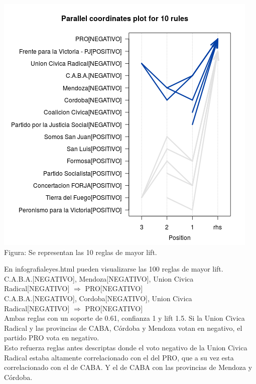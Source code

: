 \documentclass{endm}
\begin{document}
\begin{center}
\includegraphics[scale=0.5]{graficos/paracoordProvinciasPartidos.png} \\
\scriptsize{Figura: Se representan las 10 reglas de mayor lift.}
\end{center} 

En infografialeyes.html pueden visualizarse las 100 reglas de mayor lift. \\

{C.A.B.A.[NEGATIVO],        
Mendoza[NEGATIVO], 
Union Civica Radical[NEGATIVO]} $\Longrightarrow$ {PRO[NEGATIVO]} \\

{C.A.B.A.[NEGATIVO],                  Cordoba[NEGATIVO],  Union Civica Radical[NEGATIVO]}  $\Longrightarrow$ {PRO[NEGATIVO]}\\

Ambas reglas con un soporte de 0.61, confianza 1 y lift 1.5. Si la Union Civica Radical y las provincias de CABA, Córdoba y Mendoza votan en negativo, el partido PRO vota en negativo.\\

Esto refuerza reglas antes descriptas donde el voto negativo de la Union Civica Radical estaba altamente correlacionado con el del PRO, que a su vez esta correlacionado con el de CABA. Y el de CABA con las provincias de Mendoza y Córdoba.\\
\end{document}
